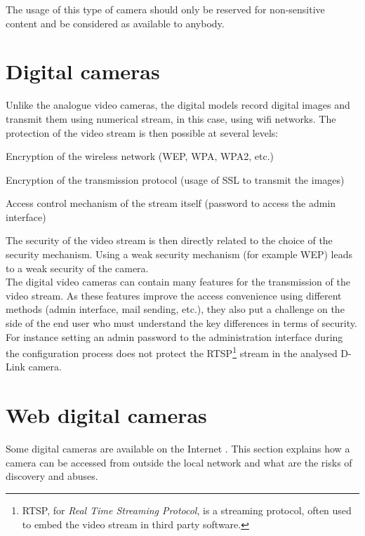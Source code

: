 The usage of this type of camera should only be reserved for non-sensitive content and be considered as available to anybody.

\section{Digital cameras}
\label{sec:cam-digital}

Unlike the analogue video cameras, the digital models record digital images and transmit them using numerical stream, in this case, using wifi networks.
The protection of the video stream is then possible at several levels:\\

\begin{itemizealt}
\item Encryption of the wireless network (WEP, WPA, WPA2, etc.)
\item Encryption of the transmission protocol (usage of SSL to transmit the images)
\item Access control mechanism of the stream itself (password to access the admin interface)
\end{itemizealt}

The security of the video stream is then directly related to the choice of the security mechanism.
Using a weak security mechanism (for example WEP) leads to a weak security of the camera.\\

The digital video cameras can contain many features for the transmission of the video stream.
As these features improve the access convenience using different methods (admin interface, mail sending, etc.), they also put a challenge on the side of the end user who must understand the key differences in terms of security.
For instance setting an admin password to the administration interface during the configuration process does not protect the RTSP\footnote{RTSP, for \emph{Real Time Streaming Protocol}, is a streaming protocol, often used to embed the video stream in third party software.} stream in the analysed D-Link camera.

\section{Web digital cameras}
\label{sec:cam-google}

Some digital cameras are available on the Internet .
This section explains how a camera can be accessed from outside the local network and what are the risks of discovery and abuses.

